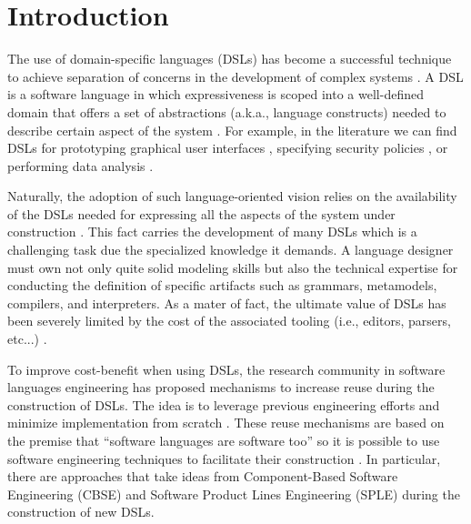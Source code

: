 \section{Introduction}
\label{sec:introduction}

The use of domain-specific languages (DSLs) has become a successful technique to achieve separation of concerns in the development of complex systems \cite{Cook:2006}. A DSL is a software language in which expressiveness is scoped into a well-defined domain that offers a set of abstractions (a.k.a., language constructs) needed to describe certain aspect of the system \cite{Combemale:2014}. For example, in the literature we can find DSLs for prototyping graphical user interfaces \cite{Oney:2012}, specifying security policies \cite{Lodderstedt:2002}, or performing data analysis \cite{Eberius:2012}. 

Naturally, the adoption of such language-oriented vision relies on the availability of the DSLs needed for expressing all the aspects of the system under construction \cite{Clark:2013}. This fact carries the development of many DSLs which is a challenging task due the specialized knowledge it demands. A language designer must own not only quite solid modeling skills but also the technical expertise for conducting the definition of specific artifacts such as grammars, metamodels, compilers, and interpreters. As a mater of fact, the ultimate value of DSLs has been severely limited by the cost of the associated tooling (i.e., editors, parsers, etc...) \cite{jezequel:2014}.

To improve cost-benefit when using DSLs, the research community in software languages engineering has proposed mechanisms to increase reuse during the construction of DSLs. The idea is to leverage previous engineering efforts and minimize implementation from scratch \cite{Storm:2013}. These reuse mechanisms are based on the premise that ``software languages are software too'' \cite{Favre:2011} so it is possible to use software engineering techniques to facilitate their construction \cite{Kleppe:2009}. In particular, there are approaches that take ideas from Component-Based Software Engineering (CBSE) \cite{Cleenewerck:2003} and Software Product Lines Engineering (SPLE)  \cite{Zschaler:2010} during the construction of new DSLs.

